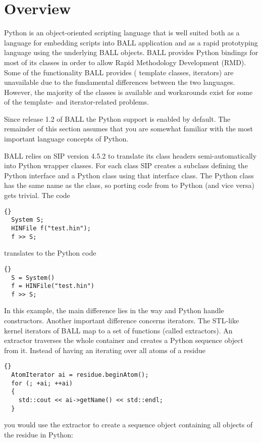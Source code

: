\section{Overview}
Python is an object-oriented scripting language\cite{Python} that is well
suited both as a language for embedding scripts into BALL application and as a
rapid prototyping language using the underlying BALL objects.
BALL provides Python bindings for most of its classes in order to allow Rapid
Methodology Development (RMD). Some of the functionality BALL provides (\eg
template classes, iterators) are unavailable due to the fundamental differences 
between the two languages. However, the majority of the classes is available and
workarounds exist for some of the template- and iterator-related problems.

Since release 1.2 of BALL the Python support is enabled by default. The 
remainder of this section assumes that you are somewhat familiar with the most
important language concepts of Python.

BALL relies on SIP \cite{SIP} version 4.5.2 to translate its class
headers semi-automatically into Python wrapper classes. For each \CPP class
SIP creates a subclass defining the Python interface and a Python class
using that \CPP interface class. The Python class has the same name as the
\CPP class, so porting code from \CPP to Python (and vice versa) gets trivial.
The \CPP code 

\begin{lstlisting}{}
  System S;
  HINFile f("test.hin");
  f >> S;
\end{lstlisting}

\noindent
translates to the Python code

\begin{lstlisting}{}
  S = System()
  f = HINFile("test.hin")
  f >> S;
\end{lstlisting}

\noindent
In this example, the main difference lies in the way \CPP and Python handle
constructors. Another important difference concerns iterators. The STL-like
kernel iterators of BALL map to a set of functions (called extractors). An
extractor traverses the whole container and creates a Python sequence object
from it. Instead of having an  iterating over all atoms of
a residue

\begin{lstlisting}{}
  AtomIterator ai = residue.beginAtom();
  for (; +ai; ++ai)
  {
    std::cout << ai->getName() << std::endl;
  }
\end{lstlisting}
\noindent
you would use the  extractor to create a sequence
object containing all objects of the residue in Python:

